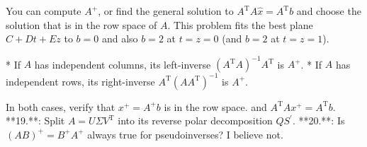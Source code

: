You can compute \(A^{+}\), or find the general solution to \(A^{\mathrm{T}}A\widehat{x}=A^{\mathrm{T}}b\) and choose the solution that is in the row space of \(A\). This problem fits the best plane \(C+Dt+Ez\) to \(b=0\) and also \(b=2\) at \(t=z=0\) (and \(b=2\) at \(t=z=1\)).

* If \(A\) has independent columns, its left-inverse \((A^{\mathrm{T}}A)^{-1}A^{\mathrm{T}}\) is \(A^{+}\).
* If \(A\) has independent rows, its right-inverse \(A^{\mathrm{T}}(AA^{\mathrm{T}})^{-1}\) is \(A^{+}\).

In both cases, verify that \(x^{+}=A^{+}b\) is in the row space. and \(A^{\mathrm{T}}Ax^{+}=A^{\mathrm{T}}b\).
**19.**: Split \(A=U\Sigma V^{\mathrm{T}}\) into its reverse polar decomposition \(QS^{\prime}\).
**20.**: Is \((AB)^{+}=B^{+}A^{+}\) always true for pseudoinverses? I believe not.

